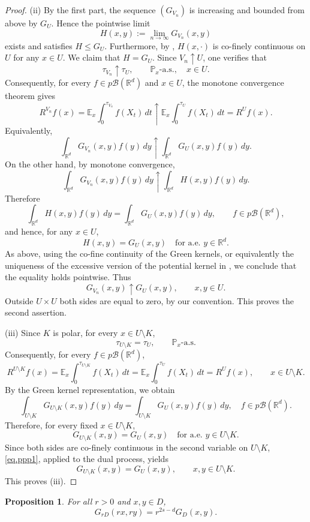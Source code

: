 \documentclass[11pt,a4paper,reqno]{amsart}
\newtheorem{proposition}[theorem]{\bf Proposition}
\theoremstyle{definition}
\numberwithin{equation}{section}
\begin{document}
\begin{proof}
(ii) By the first part, the sequence $(G_{V_n})$ is increasing and bounded from
above by $G_U$. Hence the pointwise limit
\[
H(x,y):=\lim_{n\to\infty}G_{V_n}(x,y)
\]
exists and satisfies $H\leq G_U$. Furthermore, by \cite[Proposition II.2.2]{BG}, $H(x,\cdot)$ is co-finely 
continuous on $U$ for any $x\in U$.
We claim that $H=G_U$. Since $V_n\uparrow U$, one verifies that 
\[
\tau_{V_n}\uparrow \tau_U,\qquad \mathbb P_x\text{-a.s.},\quad x\in U.
\]
Consequently, for every $f\in p\mathscr B(\mathbb R^d)$ and $x\in U$,
the monotone convergence theorem gives
\[
R^{V_n}f(x)
=
\mathbb E_x\int_0^{\tau_{V_n}} f(X_t)\,dt
\uparrow
\mathbb E_x\int_0^{\tau_U} f(X_t)\,dt
=
R^U f(x).
\]
Equivalently,
\[
\int_{\mathbb R^d}G_{V_n}(x,y)f(y)\,dy
\uparrow
\int_{\mathbb R^d}G_U(x,y)f(y)\,dy.
\]
On the other hand, by monotone convergence,
\[
\int_{\mathbb R^d}G_{V_n}(x,y)f(y)\,dy
\uparrow
\int_{\mathbb R^d}H(x,y)f(y)\,dy.
\]
Therefore
\[
\int_{\mathbb R^d}H(x,y)f(y)\,dy
=
\int_{\mathbb R^d}G_U(x,y)f(y)\,dy,
\qquad f\in p\mathscr B(\mathbb R^d),
\]
and hence, for any $x\in U$,
\[
H(x,y)=G_U(x,y)
\quad \text{for a.e. } y\in \mathbb R^d.
\]
As above, using the co-fine continuity of the Green kernels, or equivalently
the uniqueness of the excessive version of the potential kernel in
\cite[Theorem VI.1.4]{BG}, we conclude that the equality holds pointwise.
Thus
\[
G_{V_n}(x,y)\uparrow G_U(x,y),
\qquad x,y\in U.
\]
Outside $U\times U$ both sides are equal to zero, by our convention. This
proves the second assertion.

(iii) 
Since $K$  is polar, for every $x\in U\setminus K$,
\[
\tau_{U\setminus K}=\tau_U,
\qquad \mathbb P_x\text{-a.s.}
\]
Consequently,  for every $f\in p\mathscr B(\mathbb R^d)$,
\[
R^{U\setminus K}f(x)
=
\mathbb E_x\int_0^{\tau_{U\setminus K}}f(X_t)\,dt
=
\mathbb E_x\int_0^{\tau_U}f(X_t)\,dt
=
R^Uf(x),
\qquad x\in U\setminus K.
\]
By the Green kernel representation, we obtain
\[
\int_{U\setminus K}G_{U\setminus K}(x,y)f(y)\,dy
=
\int_{U\setminus K}G_U(x,y)f(y)\,dy,
\quad f\in p\mathscr B(\mathbb R^d).
\]
Therefore, for every fixed $x\in U\setminus K$,
\[
G_{U\setminus K}(x,y)=G_U(x,y)
\quad \text{for a.e. }y\in U\setminus K.
\]
Since both sides are co-finely continuous in the second variable on
$U\setminus K$, \eqref{eq.ppp1}, applied to the dual process, yields
\[
G_{U\setminus K}(x,y)=G_U(x,y),
\qquad x,y\in U\setminus K.
\]
This proves (iii).
\end{proof}


\begin{proposition}
\label{green-critical-lemma}
For all $r>0$ and $x,y\in D$,
\[
G_{rD}(rx,ry)=r^{2s-d}G_D(x,y).
\]
\end{proposition}
\end{document}
